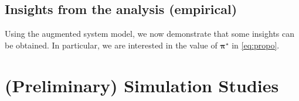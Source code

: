 \documentclass[letter]{article}
\newtheorem{prop}{Proposition}
\theoremstyle{remark}
\begin{document}

\subsection{Insights from the analysis (empirical)}
Using the augmented system model, we now demonstrate that some insights can be obtained. In particular, we are interested in the value of $\bm{\pi}^\star$ in \eqref{eq:propo}. 

\section{(Preliminary) Simulation Studies}


%
%




\end{document}
